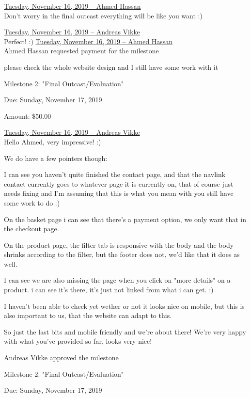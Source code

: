 \documentclass[11pt]{report}
\begin{document}
\noindent\underline{Tuesday, November 16, 2019 – Ahmed Hassan}\\
\noindent Don’t worry in the final outcast everything will be like you want :)

\noindent\underline{Tuesday, November 16, 2019 – Andreas Vikke}\\
\noindent Perfect! :)
\newpage
\noindent\underline{Tuesday, November 16, 2019 – Ahmed Hassan}\\
\noindent Ahmed Hassan requested payment for the milestone

\noindent please check the whole website design and I still have some work with it

Milestone 2: "Final Outcast/Evaluation"

Due: Sunday, November 17, 2019

Amount: \$50.00

\noindent\underline{Tuesday, November 16, 2019 – Andreas Vikke}\\
\noindent Hello Ahmed, very impressive! :)

\noindent We do have a few pointers though:

\noindent I can see you haven't quite finished the contact page, and that the navlink contact currently goes to whatever page it is currently on, that of course just needs fixing and I'm assuming that this is what you mean with you still have some work to do :)

\noindent On the basket page i can see that there's a payment option, we only want that in the checkout page.

\noindent On the product page, the filter tab is responsive with the body and the body shrinks according to the filter, but the footer does not, we'd like that it does as well.

\noindent I can see we are also missing the page when you click on "more details" on a product. i can see it's there, it's just not linked from what i can get. :)

\noindent I haven't been able to check yet wether or not it looks nice on mobile, but this is also important to us, that the website can adapt to this.

\noindent So just the last bits and mobile friendly and we're about there! We're very happy with what you've provided so far, looks very nice!

\noindent Andreas Vikke approved the milestone

Milestone 2: "Final Outcast/Evaluation"

Due: Sunday, November 17, 2019
\end{document}
